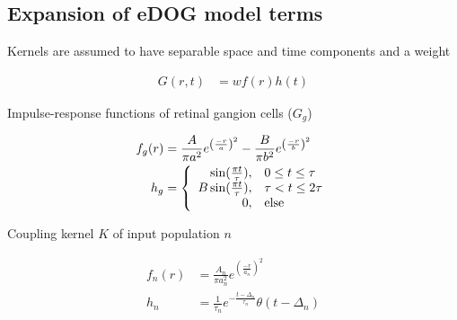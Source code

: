 \documentclass{article}
\begin{document}
\subsection{Expansion of eDOG model terms}
Kernels are assumed to have separable space and time components and a weight \citep{einevoll2012, mobarhan2018} 

\begin{align*}
	G(r,t) & = w f(r) h(t)
\end{align*}

Impulse-response functions of retinal gangion cells ($G_g$)

\begin{align*}
	f_g(r) & = \frac{A}{\pi a^2} e^{\left( \frac{-r}{a} \right)^2} - 
			 \frac{B}{\pi b^2} e^{\left( \frac{-r}{b} \right)^2} \\
	h_g & = \left \lbrace
	\begin{array}{r@{}l}
		\sin(\frac{\pi t}{\tau}), & \quad 0 \leq t \leq \tau \\
		B \sin(\frac{\pi t}{\tau}), & \quad \tau < t \leq 2 \tau \\
		0, & \quad \text{else}
	\end{array} \right.
\end{align*}

Coupling kernel $K$ of input population $n$

\begin{align*}
	f_n(r) & = \frac{A_n}{\pi a_n^2} e^{\left( \frac{-r}{a_n} \right)^2} \\
	h_n & = \frac{1}{\tau_n} e^{-\frac{t - \Delta_n}{\tau_n}} \theta(t - \Delta_n)
\end{align*}



\end{document}
